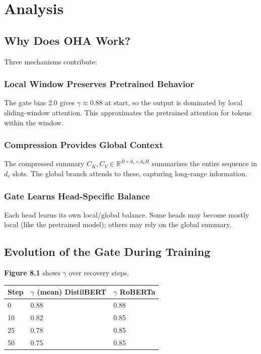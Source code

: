 
\section{Analysis}

\subsection{Why Does OHA Work?}

Three mechanisms contribute:

\subsubsection{Local Window Preserves Pretrained Behavior}

The gate bias 2.0 gives $\gamma \approx 0.88$ at start, so the output is 
dominated by local sliding-window attention. This approximates the 
pretrained attention for tokens within the window.

\subsubsection{Compression Provides Global Context}

The compressed summary $C_K, C_V \in \mathbb{R}^{B \times d_c \times d_h H}$ 
summarizes the entire sequence in $d_c$ slots. The global branch attends 
to these, capturing long-range information.

\subsubsection{Gate Learns Head-Specific Balance}

Each head learns its own local/global balance. Some heads may become 
mostly local (like the pretrained model); others may rely on the global 
summary.

\subsection{Evolution of the Gate During Training}

\textbf{Figure 8.1} shows $\gamma$ over recovery steps.

\begin{table}[H]
\centering
\small
\begin{tabular}{lll}
\toprule
\textbf{Step} & \textbf{$\gamma$ (mean) DistilBERT} & \textbf{$\gamma$ RoBERTa} \\
\midrule
0 & 0.88 & 0.88 \\
10 & 0.82 & 0.85 \\
25 & 0.78 & 0.85 \\
50 & 0.75 & 0.85 \\
\bottomrule
\end{tabular}
\end{table}


